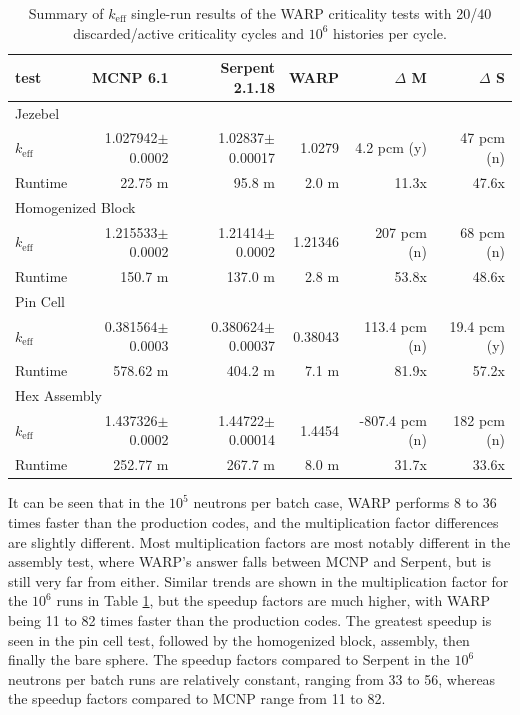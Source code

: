\begin{table}[h]
\centering
\caption{Summary of $k_\mathrm{eff}$ single-run results of the WARP criticality tests with 20/40 discarded/active criticality cycles and $10^6$ histories per cycle.}
\label{test_summary_6}
\begin{tabular}{| l | r | r | r | r | r |}
 \hline
 test & MCNP 6.1 & Serpent 2.1.18 & WARP & $\Delta$ M & $\Delta$ S  \\
\hline
\hline
\multicolumn{6}{|l|}{Jezebel}  \\
\hline
 $k_\mathrm{eff}$ & 1.027942$\pm$0.0002 & 1.02837$\pm$0.00017 & 1.0279 & 4.2 pcm (y) & 47 pcm  (n) \\
 \hline
 Runtime               & 22.75 m & 95.8 m &  2.0 m & 11.3x  & 47.6x  \\
 \hline
 \hline
\multicolumn{6}{|l|}{Homogenized Block }\\
\hline
 $k_\mathrm{eff}$ & 1.215533$\pm$0.0002 & 1.21414$\pm$0.0002 & 1.21346 & 207 pcm (n) &  68 pcm (n)  \\
 \hline
 Runtime               & 150.7 m & 137.0 m & 2.8 m & 53.8x & 48.6x  \\
 \hline
  \hline
\multicolumn{6}{|l|}{Pin Cell}\\
\hline
 $k_\mathrm{eff}$ & 0.381564$\pm$0.0003 & 0.380624$\pm$0.00037 & 0.38043 & 113.4 pcm (n) &  19.4 pcm (y)  \\
 \hline
 Runtime               & 578.62 m & 404.2 m & 7.1 m & 81.9x & 57.2x \\
 \hline
  \hline
\multicolumn{6}{|l|}{Hex Assembly}\\
\hline
 $k_\mathrm{eff}$ & 1.437326$\pm$0.0002 & 1.44722$\pm$0.00014 & 1.4454 & -807.4 pcm (n) &  182 pcm (n) \\
 \hline
 Runtime               & 252.77 m & 267.7 m & 8.0 m & 31.7x & 33.6x \\
 \hline
\end{tabular}
\end{table}

It can be seen that in the $10^5$ neutrons per batch case, WARP performs 8 to 36 times faster than the production codes, and the multiplication factor differences are slightly different.  Most multiplication factors are most notably different in the assembly test, where WARP's answer falls between MCNP and Serpent, but is still very far from either.  Similar trends are shown in the multiplication factor for the $10^6$ runs in Table \ref{test_summary_6}, but the speedup factors are much higher, with WARP being 11 to 82 times faster than the production codes.   The greatest speedup is seen in the pin cell test, followed by the homogenized block, assembly, then finally the bare sphere.  The speedup factors compared to Serpent in the $10^6$ neutrons per batch runs are relatively constant, ranging from 33 to 56, whereas the speedup factors compared to MCNP range from 11 to 82.

